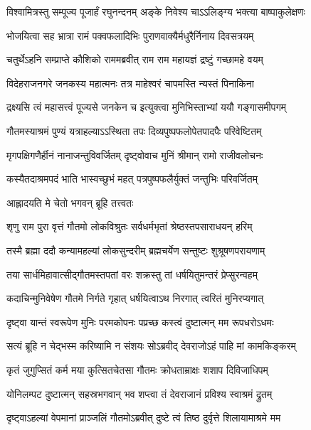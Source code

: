 \twolineshloka
{विश्वामित्रस्तु सम्पूज्य पूजार्हं रघुनन्दनम्}
{अङ्के निवेश्य चाऽऽलिङ्ग्य भक्त्या बाष्पाकुलेक्षणः} %

\twolineshloka
{भोजयित्वा सह भ्रात्रा रामं पक्वफलादिभिः}
{पुराणवाक्यैर्मधुरैर्निनाय दिवसत्रयम्} %

\twolineshloka
{चतुर्थेऽहनि सम्प्राप्ते कौशिको राममब्रवीत्}
{राम राम महायज्ञं द्रष्टुं गच्छामहे वयम्} %

\twolineshloka
{विदेहराजनगरे जनकस्य महात्मनः}
{तत्र माहेश्वरं चापमस्ति न्यस्तं पिनाकिना} %

\twolineshloka
{द्रक्ष्यसि त्वं महासत्त्वं पूज्यसे जनकेन च}
{इत्युक्त्वा मुनिभिस्ताभ्यां ययौ गङ्गासमीपगम्} %

\twolineshloka
{गौतमस्याश्रमं पुण्यं यत्राहल्याऽऽस्थिता तपः}
{दिव्यपुष्पफलोपेतपादपैः परिवेष्टितम्} %

\twolineshloka
{मृगपक्षिगणैर्हीनं नानाजन्तुविवर्जितम्}
{दृष्ट्वोवाच मुनिं श्रीमान् रामो राजीवलोचनः} %

\twolineshloka
{कस्यैतदाश्रमपदं भाति भास्वच्छुभं महत्}
{पत्रपुष्पफलैर्युक्तं जन्तुभिः परिवर्जितम्} %

\onelineshloka
{आह्लादयति मे चेतो भगवन् ब्रूहि तत्त्वतः} %


\twolineshloka
{शृणु राम पुरा वृत्तं गौतमो लोकविश्रुतः}
{सर्वधर्मभृतां श्रेष्ठस्तपसाराधयन् हरिम्} %

\twolineshloka
{तस्मै ब्रह्मा ददौ कन्यामहल्यां लोकसुन्दरीम्}
{ब्रह्मचर्येण सन्तुष्टः शुश्रूषणपरायणाम्} %

\twolineshloka
{तया सार्धमिहावात्सीद्गौतमस्तपतां वरः}
{शक्रस्तु तां धर्षयितुमन्तरं प्रेप्सुरन्वहम्} %

\twolineshloka
{कदाचिन्मुनिवेषेण गौतमे निर्गते गृहात्}
{धर्षयित्वाऽथ निरगात् त्वरितं मुनिरप्यगात्} %

\twolineshloka
{दृष्ट्वा यान्तं स्वरूपेण मुनिः परमकोपनः}
{पप्रच्छ कस्त्वं दुष्टात्मन् मम रूपधरोऽधमः} %

\twolineshloka
{सत्यं ब्रूहि न चेद्भस्म करिष्यामि न संशयः}
{सोऽब्रवीद् देवराजोऽहं पाहि मां कामकिङ्करम्} %

\twolineshloka
{कृतं जुगुप्सितं कर्म मया कुत्सितचेतसा}
{गौतमः क्रोधताम्राक्षः शशाप दिविजाधिपम्} %

\twolineshloka
{योनिलम्पट दुष्टात्मन् सहस्रभगवान् भव}
{शप्त्वा तं देवराजानं प्रविश्य स्वाश्रमं द्रुतम्} %

\twolineshloka
{दृष्ट्वाऽहल्यां वेपमानां प्राञ्जलिं गौतमोऽब्रवीत्}
{दुष्टे त्वं तिष्ठ दुर्वृत्ते शिलायामाश्रमे मम} %

